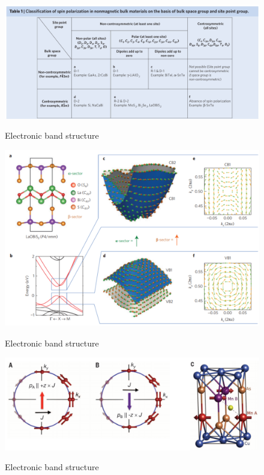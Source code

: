 \documentclass[11pt,edeposit,draftthesis]{uiucthesis2020}
\begin{document}
\begin{mainmatter}
\begin{figure}
\centering\includegraphics[width=\columnwidth]{figures/ch2/zhang_2.png} \\
\caption{\label{fig:zhang_2}
Electronic band structure
}
\end{figure}

\begin{figure}
\centering\includegraphics[width=\columnwidth]{figures/ch2/zhang_3.png} \\
\caption{\label{fig:zhang_3}
Electronic band structure
}
\end{figure}

\begin{figure}
\centering\includegraphics[width=\columnwidth]{figures/ch2/wadley_1.png} \\
\caption{\label{fig:wadley_1}
Electronic band structure
}
\end{figure}


\end{mainmatter}
\end{document}
